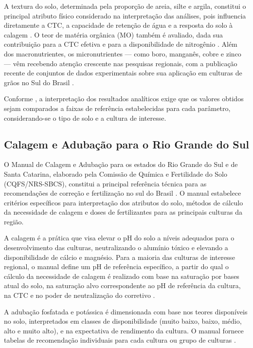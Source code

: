 A textura do solo, determinada pela proporção de areia, silte e argila,
constitui o principal atributo físico considerado na interpretação das análises,
pois influencia diretamente a CTC, a capacidade de retenção de água e a
resposta do solo à calagem \citep{ManualCalagem2016}. O teor de matéria orgânica
(MO) também é avaliado, dada sua contribuição para a CTC efetiva e para a
disponibilidade de nitrogênio \citep{Santos2003}. Além dos macronutrientes,
os micronutrientes --- como boro, manganês, cobre e zinco --- vêm recebendo
atenção crescente nas pesquisas regionais, com a publicação recente de
conjuntos de dados experimentais sobre sua aplicação em culturas de grãos
no Sul do Brasil \citep{FontouraEtAl2026}.

Conforme \cite{EmbrapaDoc206}, a interpretação dos resultados analíticos exige
que os valores obtidos sejam comparados a faixas de referência estabelecidas
para cada parâmetro, considerando-se o tipo de solo e a cultura de interesse.

\subsection{Calagem e Adubação para o Rio Grande do Sul}

O Manual de Calagem e Adubação para os estados do Rio Grande do Sul e de
Santa Catarina, elaborado pela Comissão de Química e Fertilidade do Solo
(CQFS/NRS-SBCS), constitui a principal referência técnica para as
recomendações de correção e fertilização no sul do Brasil
\citep{ManualCalagem2016}. O manual estabelece critérios específicos para
interpretação dos atributos do solo, métodos de cálculo da necessidade de
calagem e doses de fertilizantes para as principais culturas da região.

A calagem é a prática que visa elevar o pH do solo a níveis adequados para
o desenvolvimento das culturas, neutralizando o alumínio tóxico e elevando
a disponibilidade de cálcio e magnésio. Para a maioria das culturas de interesse
regional, o manual define um pH de referência específico, a partir do qual
o cálculo da necessidade de calagem é realizado com base na saturação por bases
atual do solo, na saturação alvo correspondente ao pH de referência da cultura,
na CTC e no poder de neutralização do corretivo \citep{ManualCalagem2016}.

A adubação fosfatada e potássica é dimensionada com base nos teores
disponíveis no solo, interpretados em classes de disponibilidade (muito baixo,
baixo, médio, alto e muito alto), e na expectativa de rendimento da cultura.
O manual fornece tabelas de recomendação individuais para cada cultura ou grupo
de culturas \citep{ManualCalagem2016}.

